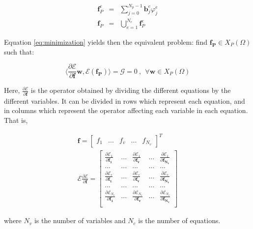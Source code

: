 \documentclass{CFD2011}
\begin{document}
\begin{eqnarray}
\mathbf{f}_P^e&=&\sum_{j=0}^{N_p-1} \mathbf{b}_j^e \varphi_j^e \label{eq:suma} \\
\mathbf{f}_P&=&\bigcup _{e=1}^{N_e}\mathbf{f}_P^e
\end{eqnarray}


Equation \ref{eq:minimization} yields then the equivalent problem: find $\mathbf{f_P} \in X_P(\Omega)$ such that:

\begin{equation}
\big\langle \frac{\partial\mathcal{E}}{\partial \mathbf{f}}\mathbf{w} , \mathcal{E}(\mathbf{f_P}) \big\rangle=\mathcal{G}=0 \ ,\ \ \forall \mathbf{w}\in X_P(\Omega)
\end{equation}


Here, $\frac{\partial\mathcal{E}}{\partial \mathbf{f}}$ is the operator obtained by dividing the different equations by the different variables. It can be divided in rows which represent each equation, and in columns which represent the operator affecting each variable in each equation. That is,

\begin{eqnarray}
\mathbf{f}=\left[ \begin{array}{ccccc} f_1 & ... & f_{v} & ... & f_{N_v} \end{array} \right]^T \nonumber\\
 {\mathcal{E}} {\frac{\partial\mathcal{E}}{\partial \mathbf{f}}}=\left[ \begin{array}{ccccc}
 {\frac{\partial\mathcal{E}_{1}}{\partial \mathbf{f_1}}} & ... &  {\frac{\partial\mathcal{E}_{1}}{\partial \mathbf{f_v}}} & ... &  {\frac{\partial\mathcal{E}_{1}}{\partial \mathbf{f_{N_v}}}} \\
... & ... & ... & ... & ... \\
 {\frac{\partial\mathcal{E}_{c}}{\partial \mathbf{f_{1}}}} & ... &  {\frac{\partial\mathcal{E}_{c}}{\partial \mathbf{f_{v}}}} & ... &  {\frac{\partial\mathcal{E}_{c}}{\partial \mathbf{f_{N_v}}}} \\
... & ... & ... & ... & ... \\
 {\frac{\partial\mathcal{E}_{N_c}}{\partial \mathbf{f_{1}}}} & ... &  {\frac{\partial\mathcal{E}_{N_c}}{\partial \mathbf{f_{v}}}} & ... &  {\frac{\partial\mathcal{E}_{N_c}}{\partial \mathbf{f_{N_v}}}} \\
\end{array} \right] 
\label{eq:eqOp}
\end{eqnarray}

\noindent where $N_v$ is the number of variables and $N_c$ is the number of equations.
\end{document}
